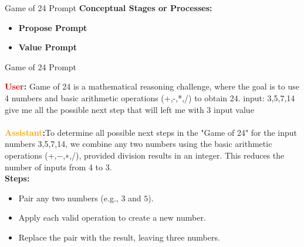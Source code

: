 \documentclass[aspectratio=169, xcolor={dvipsnames}, 10pt, brazil]{beamer}
\begin{document}
\begin{frame}{Game of 24 Prompt}
\textbf{Conceptual Stages or Processes:}
\vspace{.3cm}
\begin{itemize}
    \item \textbf{Propose Prompt}
    \item \textbf{Value Prompt}
    
    
\end{itemize}
\end{frame}


\begin{frame}{Game of 24 Prompt}
    \begin{tcolorbox}[
        colback=gray!5!white, 
        colframe=black!50!white, 
        title=\textbf{\small Propose Prompt}, 
        fonttitle=\bfseries\small, 
        coltitle=white, 
        boxrule=0.72mm, 
        sharp corners=southwest, 
        enhanced, 
        width=\textwidth-1.8cm, 
        enlarge left by=0.72cm
    ]
        
        \textbf{\small \textcolor{red}{User}:}  
        Game of 24 is a mathematical reasoning challenge, where the goal is to use 4 numbers and basic
arithmetic operations (+,-,*,/) to obtain 24.
input: 3,5,7,14
give me all the possible next step that will left me with 3 input value \\
\\
\textbf{\textcolor{orange}{Assistant}:}To determine all possible next steps in the "Game of 24" for the input numbers 3,5,7,14, we combine any two numbers using the basic arithmetic operations (+,−,∗,/), provided division results in an integer. This reduces the number of inputs from 4 to 3.\\
\textbf{Steps:}
\begin{itemize}
    \item Pair any two numbers (e.g., \(3\) and \(5\)).
    \item Apply each valid operation to create a new number.
    \item Replace the pair with the result, leaving three numbers.
\end{itemize}
    \end{tcolorbox}
\end{frame}
\end{document}
